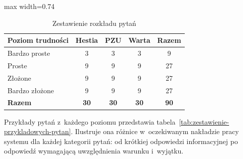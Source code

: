 \begin{table}[H]
  \caption{Zestawienie rozkładu pytań}\label{tab:zestawienie-rozkladu-pytan}
  \centering
  \small
  \begin{adjustbox}{max width=0.74\textwidth}
    \begin{tabular}{@{} l c c c c @{}}
      \toprule
      \textbf{Poziom trudności}
      & \textbf{Hestia}
      & \textbf{PZU}
      & \textbf{Warta}
      & \textbf{Razem}                                            \\
      \midrule
      Bardzo proste  & 3               & 3           & 3           & 9           \\
      Proste         & 9               & 9           & 9           & 27          \\
      Złożone        & 9               & 9           & 9           & 27          \\
      Bardzo złożone & 9               & 9           & 9           & 27          \\
      \midrule
      \textbf{Razem} & \textbf{30}     & \textbf{30} & \textbf{30} & \textbf{90} \\
      \bottomrule
    \end{tabular}
  \end{adjustbox}
\end{table}

Przykłady pytań z~każdego poziomu przedstawia
tabela~\ref{tab:zestawienie-przykladowych-pytan}. Ilustruje ona różnice
w~oczekiwanym nakładzie pracy systemu dla każdej kategorii pytań: od krótkiej
odpowiedzi informacyjnej po odpowiedź wymagającą uwzględnienia warunku
i~wyjątku.


